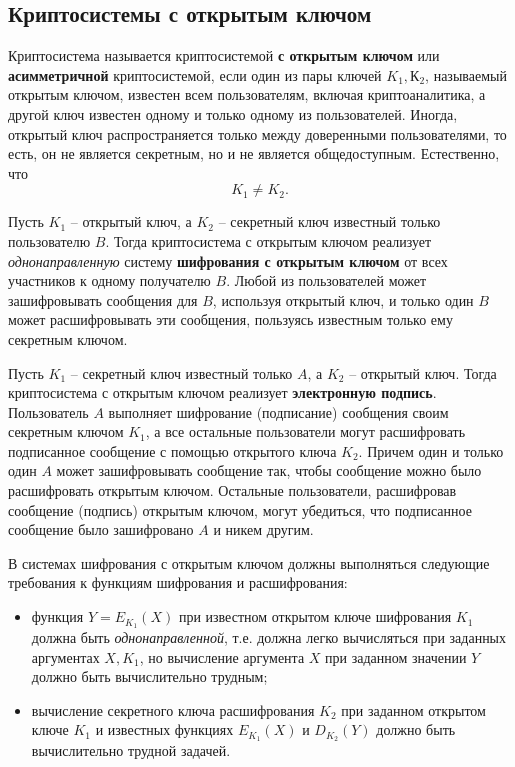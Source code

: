 \subsection{Криптосистемы с открытым ключом}

Криптосистема называется криптосистемой \textbf{с открытым ключом} или \textbf{асимметричной} криптосистемой, если один из пары ключей $K_1, К_2$, называемый открытым ключом, известен всем пользователям, включая криптоаналитика, а другой ключ известен одному и только одному из пользователей. Иногда, открытый ключ распространяется только между доверенными пользователями, то есть, он не является секретным, но и не является общедоступным. Естественно, что
    \[ K_1 \neq K_2. \]

Пусть $K_1$ -- открытый ключ, а $K_2$ -- секретный ключ известный только пользователю $B$. Тогда криптосистема с открытым ключом реализует \emph{однонаправленную} систему \textbf{шифрования с открытым ключом} от всех участников к одному получателю $B$. Любой из пользователей может зашифровывать сообщения для $B$, используя открытый ключ, и только один $B$ может расшифровывать эти сообщения, пользуясь известным только ему секретным ключом.

Пусть $K_1$ -- секретный ключ известный только $A$, а $K_2$ -- открытый ключ. Тогда криптосистема с открытым ключом реализует \textbf{электронную подпись}. Пользователь $A$ выполняет шифрование (подписание) сообщения своим секретным ключом $K_1$, а все остальные пользователи могут расшифровать подписанное сообщение с помощью открытого ключа $K_2$. Причем один и только один $A$ может зашифровывать сообщение так, чтобы сообщение можно было расшифровать открытым ключом. Остальные пользователи, расшифровав сообщение (подпись) открытым ключом, могут убедиться, что подписанное сообщение было зашифровано $A$ и никем другим.

В системах шифрования с открытым ключом должны выполняться следующие требования к функциям шифрования и расшифрования:
\begin{itemize}
   \item функция $Y = E_{K_1}(X)$ при известном открытом ключе шифрования $K_1$ должна быть \emph{однонаправленной}, т.е.  должна легко вычисляться при заданных аргументах $X, K_1$, но вычисление аргумента $X$ при заданном значении $Y$ должно быть вычислительно трудным;
   \item вычисление секретного ключа расшифрования $K_2$ при заданном открытом ключе $K_1$ и известных функциях $E_{K_1}(X)$ и $D_{K_2}(Y)$  должно быть вычислительно трудной задачей.
\end{itemize}

